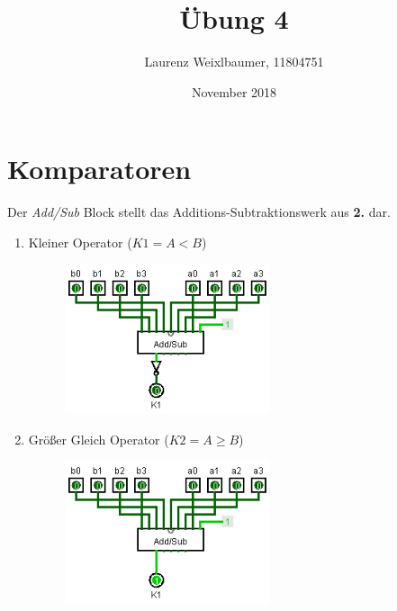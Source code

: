 \documentclass{article}
\title{Übung 4}
\author{Laurenz Weixlbaumer, 11804751}
\date{November 2018}
\begin{document}
\maketitle

\section{Komparatoren}

Der \emph{Add/Sub} Block stellt das Additions-Subtraktionswerk aus \textbf{2.} dar.

\begin{enumerate}[label=(\alph*)]

\item Kleiner Operator ($K1 = A < B$)

\begin{figure}[htp]
\begin{center}
\includegraphics[width=6cm]{comp_sm_circuit.png}
\end{center}
\end{figure}

\item Größer Gleich Operator ($K2 = A \geq B$)

\begin{figure}[htp]
\begin{center}
\includegraphics[width=6cm]{comp_grq_circuit.png}
\end{center}
\end{figure}

\end{enumerate}
\end{document}
